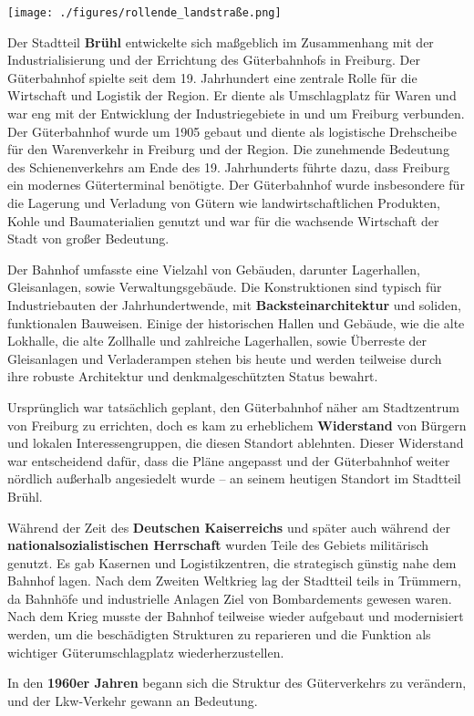 \documentclass[landscape, a4paper]{article}
\newcommand\alert[1]{\textcolor{PrimaryColor}{\textbf{#1}}}
\begin{document}
\hspace{0.4cm}
\begin{minipage}[t]{0.32\textwidth}
	\vspace{0cm}
	\setlength{\parskip}{0.25cm}

	\texttt{[image: ./figures/rollende\_landstraße.png]}
	\setlength{\parskip}{0.25cm}

	Der Stadtteil \alert{Brühl} entwickelte sich maßgeblich im Zusammenhang mit der Industrialisierung und der Errichtung des Güterbahnhofs in Freiburg. Der Güterbahnhof spielte seit dem 19. Jahrhundert eine zentrale Rolle für die Wirtschaft und Logistik der Region. Er diente als Umschlagplatz für Waren und war eng mit der Entwicklung der Industriegebiete in und um Freiburg verbunden. Der Güterbahnhof wurde um 1905 gebaut und diente als logistische Drehscheibe für den Warenverkehr in Freiburg und der Region. Die zunehmende Bedeutung des Schienenverkehrs am Ende des 19. Jahrhunderts führte dazu, dass Freiburg ein modernes Güterterminal benötigte.
	Der Güterbahnhof wurde insbesondere für die Lagerung und Verladung von Gütern wie landwirtschaftlichen Produkten, Kohle und Baumaterialien genutzt und war für die wachsende Wirtschaft der Stadt von großer Bedeutung.

	Der Bahnhof umfasste eine Vielzahl von Gebäuden, darunter Lagerhallen, Gleisanlagen, sowie Verwaltungsgebäude. Die Konstruktionen sind typisch für Industriebauten der Jahrhundertwende, mit \alert{Backsteinarchitektur} und soliden, funktionalen Bauweisen. Einige der historischen Hallen und Gebäude, wie die alte Lokhalle, die alte Zollhalle und zahlreiche Lagerhallen, sowie Überreste der Gleisanlagen und Verladerampen stehen bis heute und werden teilweise durch ihre robuste Architektur und denkmalgeschützten Status bewahrt.

	Ursprünglich war tatsächlich geplant, den Güterbahnhof näher am Stadtzentrum von Freiburg zu errichten, doch es kam zu erheblichem \alert{Widerstand} von Bürgern und lokalen Interessengruppen, die diesen Standort ablehnten. Dieser Widerstand war entscheidend dafür, dass die Pläne angepasst und der Güterbahnhof weiter nördlich außerhalb angesiedelt wurde – an seinem heutigen Standort im Stadtteil Brühl.

	Während der Zeit des \alert{Deutschen Kaiserreichs} und später auch während der \alert{nationalsozialistischen Herrschaft} wurden Teile des Gebiets militärisch genutzt. Es gab Kasernen und Logistikzentren, die strategisch günstig nahe dem Bahnhof lagen. Nach dem Zweiten Weltkrieg lag der Stadtteil teils in Trümmern, da Bahnhöfe und industrielle Anlagen Ziel von Bombardements gewesen waren. Nach dem Krieg musste der Bahnhof teilweise wieder aufgebaut und modernisiert werden, um die beschädigten Strukturen zu reparieren und die Funktion als wichtiger Güterumschlagplatz wiederherzustellen.

In den \alert{1960er Jahren} begann sich die Struktur des Güterverkehrs zu verändern, und der Lkw-Verkehr gewann an Bedeutung. 
\end{minipage}
\end{document}
